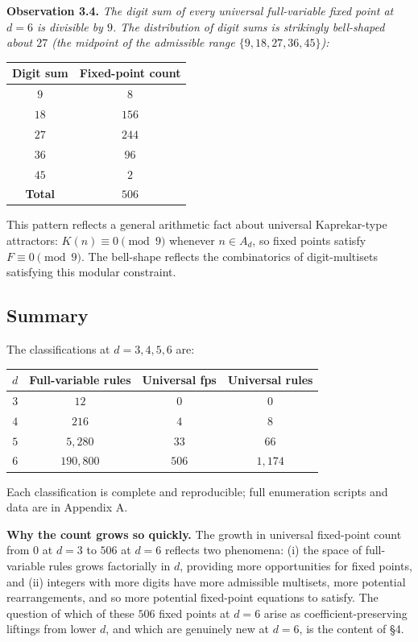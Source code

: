 \documentclass[11pt,letterpaper]{article}
\theoremstyle{paperstyle}
\theoremstyle{paperstyledef}
\theoremstyle{paperstylerem}
\begin{document}
\textbf{Observation 3.4.} \emph{The digit sum of every universal
full-variable fixed point at \(d = 6\) is divisible by \(9\). The
distribution of digit sums is strikingly bell-shaped about \(27\) (the
midpoint of the admissible range \(\{9, 18, 27, 36, 45\}\)):}

\begin{longtable}[]{@{}cc@{}}
\toprule\noalign{}
Digit sum & Fixed-point count \\
\midrule\noalign{}
\endhead
\bottomrule\noalign{}
\endlastfoot
\(9\) & \(8\) \\
\(18\) & \(156\) \\
\(27\) & \(244\) \\
\(36\) & \(96\) \\
\(45\) & \(2\) \\
\textbf{Total} & \textbf{\(506\)} \\
\end{longtable}

This pattern reflects a general arithmetic fact about universal
Kaprekar-type attractors: \(K(n) \equiv 0 \pmod 9\) whenever
\(n \in A_d\), so fixed points satisfy \(F \equiv 0 \pmod 9\). The
bell-shape reflects the combinatorics of digit-multisets satisfying this
modular constraint.

\hypertarget{summary}{%
\subsection{Summary}\label{summary}}

The classifications at \(d = 3, 4, 5, 6\) are:

\begin{longtable}[]{@{}cccc@{}}
\toprule\noalign{}
\(d\) & Full-variable rules & Universal fps & Universal rules \\
\midrule\noalign{}
\endhead
\bottomrule\noalign{}
\endlastfoot
\(3\) & \(12\) & \(0\) & \(0\) \\
\(4\) & \(216\) & \(4\) & \(8\) \\
\(5\) & \(5{,}280\) & \(33\) & \(66\) \\
\(6\) & \(190{,}800\) & \(506\) & \(1{,}174\) \\
\end{longtable}

Each classification is complete and reproducible; full enumeration
scripts and data are in Appendix A.

\textbf{Why the count grows so quickly.} The growth in universal
fixed-point count from \(0\) at \(d = 3\) to \(506\) at \(d = 6\)
reflects two phenomena: (i) the space of full-variable rules grows
factorially in \(d\), providing more opportunities for fixed points, and
(ii) integers with more digits have more admissible multisets, more
potential rearrangements, and so more potential fixed-point equations to
satisfy. The question of which of these \(506\) fixed points at
\(d = 6\) arise as coefficient-preserving liftings from lower \(d\), and
which are genuinely new at \(d = 6\), is the content of §4.
\end{document}
